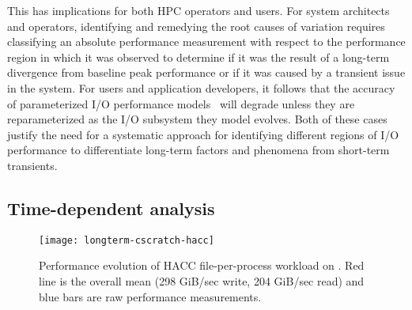 This has implications for both HPC operators and users.
For system architects and operators, identifying and remedying the root causes of variation requires classifying an absolute performance measurement with respect to the performance region in which it was observed to determine if it was the result of a long-term divergence from baseline peak performance or if it was caused by a transient issue in the system.
For users and application developers, it follows that the accuracy of parameterized I/O performance models~\cite{Xie2012,Madireddy2017} will degrade unless they are reparameterized as the I/O subsystem they model evolves.
Both of these cases justify the need for a systematic approach for identifying different regions of I/O performance to differentiate long-term factors and phenomena from short-term transients.

\subsection{Time-dependent analysis} \label{sec:features/timedependent}

\begin{figure}[t]
    \centering
    \texttt{[image: longterm-cscratch-hacc]}
    \vspace{-.35in}
    \caption{Performance evolution of HACC file-per-process workload on \cori.  Red line is the overall mean (298 GiB/sec write, 204 GiB/sec read) and blue bars are raw performance measurements.}
    \label{fig:timeseries-baseline}
\end{figure}





